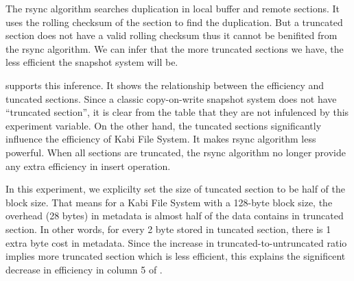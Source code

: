     The rsync algorithm searches duplication in local buffer and remote sections. It uses the rolling checksum of the section to find the duplication. But a truncated section does not have a valid rolling checksum thus it cannot be benifited from the rsync algorithm. We can infer that the more truncated sections we have, the less efficient the snapshot system will be.

     supports this inference. It shows the relationship between the efficiency and tuncated sections. Since a classic copy-on-write snapshot system does not have ``truncated section'', it is clear from the table that they are not infulenced by this experiment variable. On the other hand, the tuncated sections significantly influence the efficiency of Kabi File System. It makes rsync algorithm less powerful. When all sections are truncated, the rsync algorithm no longer provide any extra efficiency in insert operation.

    In this experiment, we explicilty set the size of tuncated section to be half of the block size. That means for a Kabi File System with a 128-byte block size, the overhead (28 bytes) in metadata is almost half of the data contains in truncated section. In other words, for every 2 byte stored in tuncated section, there is 1 extra byte cost in metadata. Since the increase in truncated-to-untruncated ratio implies more truncated section which is less efficient, this explains the significent decrease in efficiency in column 5 of .

